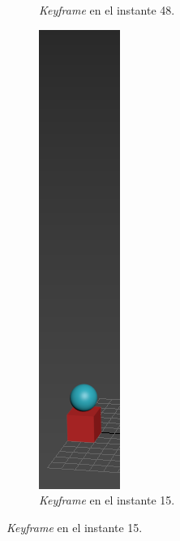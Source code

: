 \documentclass{article}
\begin{document}
\begin{figure}[H]
\begin{subfigure}[H]{0.15\textwidth}
	    \caption{\textit{Keyframe} en el instante 48.}
	\end{subfigure}
    \hfill
	\begin{subfigure}[H]{0.15\textwidth}
	    \centering
	    \includegraphics[width=\textwidth]{imagenes/p1_ins15.png}
	    \caption{\textit{Keyframe} en el instante 15.}
	\end{subfigure}
\end{figure}
\end{document}
